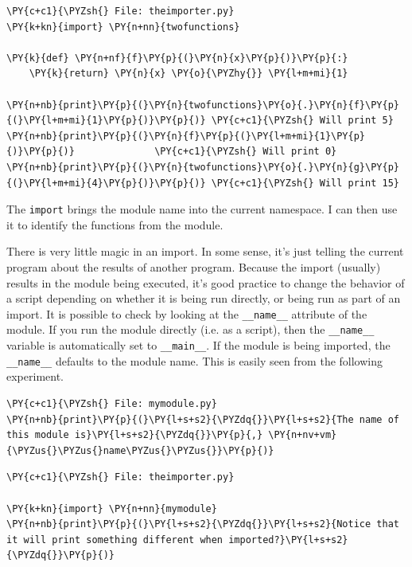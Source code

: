 \begin{Verbatim}[commandchars=\\\{\}]
\PY{c+c1}{\PYZsh{} File: theimporter.py}
\PY{k+kn}{import} \PY{n+nn}{twofunctions}

\PY{k}{def} \PY{n+nf}{f}\PY{p}{(}\PY{n}{x}\PY{p}{)}\PY{p}{:}
    \PY{k}{return} \PY{n}{x} \PY{o}{\PYZhy{}} \PY{l+m+mi}{1}

\PY{n+nb}{print}\PY{p}{(}\PY{n}{twofunctions}\PY{o}{.}\PY{n}{f}\PY{p}{(}\PY{l+m+mi}{1}\PY{p}{)}\PY{p}{)} \PY{c+c1}{\PYZsh{} Will print 5}
\PY{n+nb}{print}\PY{p}{(}\PY{n}{f}\PY{p}{(}\PY{l+m+mi}{1}\PY{p}{)}\PY{p}{)}              \PY{c+c1}{\PYZsh{} Will print 0}
\PY{n+nb}{print}\PY{p}{(}\PY{n}{twofunctions}\PY{o}{.}\PY{n}{g}\PY{p}{(}\PY{l+m+mi}{4}\PY{p}{)}\PY{p}{)} \PY{c+c1}{\PYZsh{} Will print 15}
\end{Verbatim}



The \texttt{import} brings the module name into the current namespace.  I can then use it to identify the functions from the module.  


There is very little magic in an import.  In some sense, it’s just telling the current program about the results of another program.  Because the import (usually) results in the module being executed, it’s good practice to change the behavior of a script depending on whether it is being run directly, or being run as part of an import.  It is possible to check by looking at the \texttt{\_\_name\_\_} attribute of the module.  If you run the module directly (i.e. as a script), then the \texttt{\_\_name\_\_} variable is automatically set to \texttt{\_\_main\_\_}.  If the module is being imported, the \texttt{\_\_name\_\_} defaults to the module name.  This is easily seen from the following experiment.

\begin{Verbatim}[commandchars=\\\{\}]
\PY{c+c1}{\PYZsh{} File: mymodule.py}
\PY{n+nb}{print}\PY{p}{(}\PY{l+s+s2}{\PYZdq{}}\PY{l+s+s2}{The name of this module is}\PY{l+s+s2}{\PYZdq{}}\PY{p}{,} \PY{n+nv+vm}{\PYZus{}\PYZus{}name\PYZus{}\PYZus{}}\PY{p}{)}
\end{Verbatim}


\begin{Verbatim}[commandchars=\\\{\}]
\PY{c+c1}{\PYZsh{} File: theimporter.py}

\PY{k+kn}{import} \PY{n+nn}{mymodule}
\PY{n+nb}{print}\PY{p}{(}\PY{l+s+s2}{\PYZdq{}}\PY{l+s+s2}{Notice that it will print something different when imported?}\PY{l+s+s2}{\PYZdq{}}\PY{p}{)}
\end{Verbatim}



